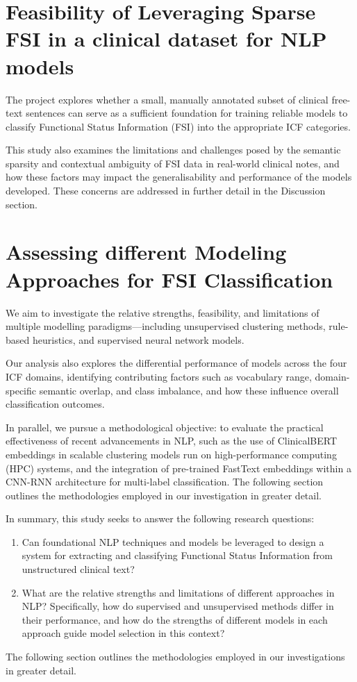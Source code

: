 \section{Feasibility of Leveraging Sparse FSI in a clinical dataset for NLP models}
\medskip
The project explores whether a small, manually annotated subset of clinical free-text sentences can serve as a sufficient foundation for training reliable models to classify Functional Status Information (FSI) into the appropriate ICF categories.\medskip

This study also examines the limitations and challenges posed by the semantic sparsity and contextual ambiguity of FSI data in real-world clinical notes, and how these factors may impact the generalisability and performance of the models developed. These concerns are addressed in further detail in the Discussion section.
\medskip
\section{Assessing different Modeling Approaches for FSI Classification}

We aim to investigate the relative strengths, feasibility, and limitations of multiple modelling paradigms—including unsupervised clustering methods, rule-based heuristics, and supervised neural network models.\medskip

Our analysis also explores the differential performance of models across the four ICF domains, identifying contributing factors such as vocabulary range, domain-specific semantic overlap, and class imbalance, and how these influence overall classification outcomes.\medskip

In parallel, we pursue a methodological objective: to evaluate the practical effectiveness of recent advancements in NLP, such as the use of ClinicalBERT embeddings in scalable clustering models run on high-performance computing (HPC) systems, and the integration of pre-trained FastText embeddings within a CNN-RNN architecture for multi-label classification. The following section outlines the methodologies employed in our investigation in greater detail.

\medskip
In summary, this study seeks to answer the following research questions:

\begin{enumerate}
\item Can foundational NLP techniques and models be leveraged to design a system for extracting and classifying Functional Status Information from unstructured clinical text?
\item What are the relative strengths and limitations of different approaches in NLP? Specifically, how do supervised and unsupervised methods differ in their performance, and how do the strengths of different models in each approach guide model selection in this context?
\end{enumerate}

The following section outlines the methodologies employed in our investigations in greater detail.

